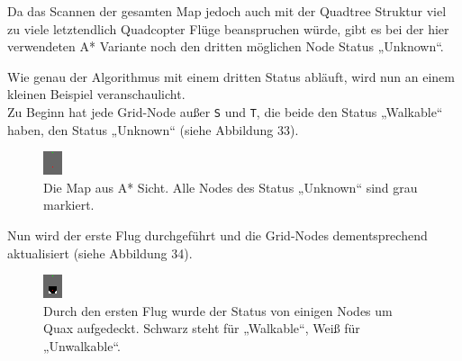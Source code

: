 \documentclass[a4paper,12pt]{article}
\newcommand{\code}{\texttt}
\begin{document}
Da das Scannen der gesamten Map jedoch auch mit der Quadtree Struktur viel zu viele letztendlich Quadcopter Flüge beanspruchen würde, gibt es bei der hier verwendeten A* Variante noch den dritten möglichen Node Status „Unknown“.

Wie genau der Algorithmus mit einem dritten Status abläuft, wird nun an einem kleinen Beispiel veranschaulicht.
\\[0.4cm]
Zu Beginn hat jede Grid-Node außer \code{S} und \code{T}, die beide den Status „Walkable“ haben, den Status „Unknown“ (siehe Abbildung 33). 
\begin{figure}[H]
\centering
    \includegraphics[width=.5\linewidth]{Bilder/Aufgabe3/Teilaufgabe_A/Beispiel_01.png}
    \caption{Die Map aus A* Sicht. Alle Nodes des Status „Unknown“ sind grau markiert.}
\end{figure}
Nun wird der erste Flug durchgeführt und die Grid-Nodes dementsprechend aktualisiert (siehe Abbildung 34).
\begin{figure}[H]
\centering
    \includegraphics[width=.5\linewidth]{Bilder/Aufgabe3/Teilaufgabe_A/Beispiel_02.png}
    \caption{Durch den ersten Flug wurde der Status von einigen Nodes um Quax aufgedeckt. Schwarz steht für „Walkable“, Weiß für „Unwalkable“.}
\end{figure}
\end{document}
